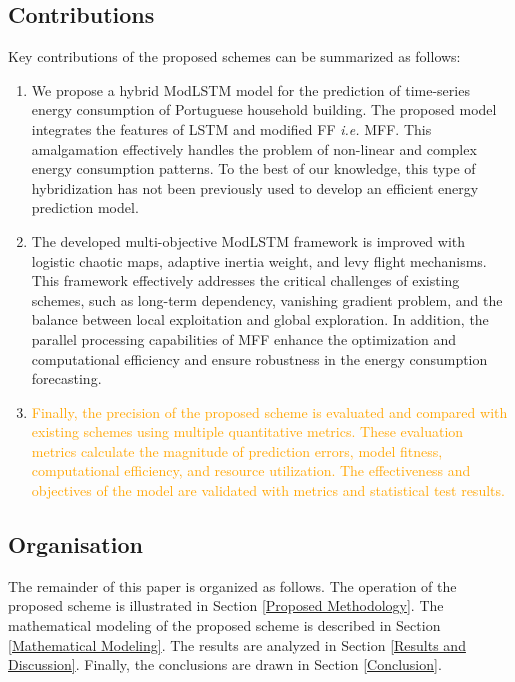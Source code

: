 \documentclass[journal]{IEEEtran}
\begin{document}
 \subsection{Contributions}
 Key contributions of the proposed schemes can be summarized as follows:
 \begin{enumerate}
     
   

\item We propose a hybrid ModLSTM model for the prediction of time-series energy consumption of Portuguese household building. The proposed model integrates the features of LSTM and modified FF \textit{i.e.} MFF. This amalgamation effectively handles the problem of non-linear and complex energy consumption patterns. To the best of our knowledge, this type of hybridization has not been previously used to develop an efficient energy prediction model.



   
\item The developed multi-objective ModLSTM framework is improved with logistic chaotic maps, adaptive inertia weight, and levy flight mechanisms. This framework effectively addresses the critical challenges of existing schemes, such as long-term dependency, vanishing gradient problem, and the balance between local exploitation and global exploration. In addition, the parallel processing capabilities of MFF enhance the optimization and computational efficiency and ensure robustness in the energy consumption forecasting.




 
   
 \item \textcolor{orange}{Finally, the precision of the proposed scheme is evaluated and compared with existing schemes using multiple quantitative metrics. These evaluation metrics calculate the magnitude of prediction errors, model fitness, computational efficiency, and resource utilization. The effectiveness and objectives of the model are validated with metrics and statistical test results.}
 
 
 
 
 

 \end{enumerate}
  
 \subsection{Organisation}  
 The remainder of this paper is organized as follows. The operation of the proposed scheme is illustrated in Section \ref{Proposed Methodology}. The mathematical modeling of the proposed scheme is described in Section \ref{Mathematical Modeling}. The results are analyzed in Section \ref{Results and Discussion}. Finally, the conclusions are drawn in Section \ref{Conclusion}. 
\end{document}
